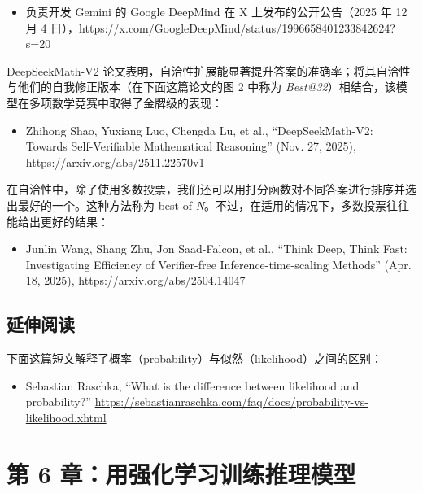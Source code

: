 \begin{itemize}
\item 负责开发 Gemini 的 Google DeepMind 在 X 上发布的公开公告（2025 年 12 月 4 日），https://x.com/GoogleDeepMind/status/1996658401233842624?s=20
\end{itemize}

DeepSeekMath-V2 论文表明，自洽性扩展能显著提升答案的准确率；将其自洽性与他们的自我修正版本（在下面这篇论文的图 2 中称为 \emph{Best@32}）相结合，该模型在多项数学竞赛中取得了金牌级的表现：

\begin{itemize}
\item Zhihong Shao, Yuxiang Luo, Chengda Lu, et al., “DeepSeekMath-V2: Towards Self-Verifiable Mathematical Reasoning” (Nov. 27, 2025), \href{https://arxiv.org/abs/2511.22570v1}{https://arxiv.org/abs/2511.22570v1}
\end{itemize}

在自洽性中，除了使用多数投票，我们还可以用打分函数对不同答案进行排序并选出最好的一个。这种方法称为 best-of-\emph{N}。不过，在适用的情况下，多数投票往往能给出更好的结果：

\begin{itemize}
\item Junlin Wang, Shang Zhu, Jon Saad-Falcon, et al., “Think Deep, Think Fast: Investigating Efficiency of Verifier-free Inference-time-scaling Methods” (Apr. 18, 2025), \href{https://arxiv.org/abs/2504.14047}{https://arxiv.org/abs/2504.14047}
\end{itemize}

\subsection{延伸阅读}

下面这篇短文解释了概率（probability）与似然（likelihood）之间的区别：

\begin{itemize}
\item Sebastian Raschka, “What is the difference between likelihood and probability?” \href{https://sebastianraschka.com/faq/docs/probability-vs-likelihood.xhtml}{https://sebastianraschka.com/faq/docs/probability-vs-likelihood.xhtml}
\end{itemize}

\section{第 6 章：用强化学习训练推理模型}

